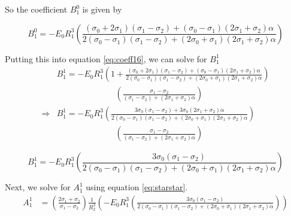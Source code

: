 So the coefficient $B_1^0$ is given by
\begin{mdframed}[backgroundcolor=gray!10, innertopmargin=0pt, innerbottommargin=10pt]
\begin{equation}
    B_1^0
     =
    -E_0 R_1^{3}
    \left(
    \frac{
    (\sigma_0 + 2\sigma_1)(\sigma_1 - \sigma_2) + (\sigma_0 - \sigma_1)(2\sigma_1 + \sigma_2)\alpha
    }
    {
    2 (\sigma_0-\sigma_1)(\sigma_1 - \sigma_2) + (2\sigma_0 + \sigma_1)(2\sigma_1 + \sigma_2)\alpha
    }
    \right)
    \label{eq:B10}
\end{equation}
\end{mdframed}
Putting this into equation \ref{eq:coeff16}, we can solve for $B_1^1$
\begin{displaymath}
    \begin{split}
    & B_1^1 =
        -E_0 R_1^3\left( 1 +
    \frac{
    (\sigma_0 + 2\sigma_1)(\sigma_1 - \sigma_2) + (\sigma_0 - \sigma_1)(2\sigma_1 + \sigma_2)\alpha
    }
    {
    2 (\sigma_0-\sigma_1)(\sigma_1 - \sigma_2) + (2\sigma_0 + \sigma_1)(2\sigma_1 + \sigma_2)\alpha
    }
    \right) \\
        & \quad\quad\quad\quad\quad\quad\quad \left(
        \frac{\sigma_1 - \sigma_2} {\left(\sigma_1 - \sigma_2\right) + \left(2\sigma_1 + \sigma_2\right)\alpha}
        \right)
    \\
    \Rightarrow
    &B_1^1 =
    -E_0 R_1^3\left(
    \frac{
    3 \sigma_0(\sigma_1 - \sigma_2) + 3\sigma_0(2\sigma_1 + \sigma_2)\alpha
    }
    {
    2 (\sigma_0-\sigma_1)(\sigma_1 - \sigma_2) + (2\sigma_0 + \sigma_1)(2\sigma_1 + \sigma_2)\alpha
    }
    \right)
    \\ & \quad\quad\quad\quad\quad\quad\quad
        \left(
        \frac{\sigma_1 - \sigma_2} {\left(\sigma_1 - \sigma_2\right) + \left(2\sigma_1 + \sigma_2\right)\alpha}
        \right)
    \end{split}
\end{displaymath}
\begin{mdframed}[backgroundcolor=gray!10, innertopmargin=0pt, innerbottommargin=10pt]
\begin{equation}
    B_1^1
    =
    -E_0 R_1^3 \left(
    \frac{
    3 \sigma_0 (\sigma_1 - \sigma_2)
    }
    {
    2 (\sigma_0-\sigma_1)(\sigma_1 - \sigma_2) + (2\sigma_0 + \sigma_1)(2\sigma_1 + \sigma_2)\alpha
    }
    \right)
    \label{eq:B11}
\end{equation}
\end{mdframed}
Next, we solve for $A_1^1$ using equation \ref{eq:starstar}.
\begin{displaymath}
\begin{split}
    A_1^1
        &=
        \left(\frac{2\sigma_1 + \sigma_2}{\sigma_1 - \sigma_2}\right) \frac{1}{R_2^3}
        \left(
        -E_0 R_1^3 \left(
        \frac{
        3 \sigma_0 (\sigma_1 - \sigma_2)
        }
        {
        2 (\sigma_0-\sigma_1)(\sigma_1 - \sigma_2) + (2\sigma_0 + \sigma_1)(2\sigma_1 + \sigma_2)\alpha
        }
        \right)
        \right)
\end{split}
\end{displaymath}

